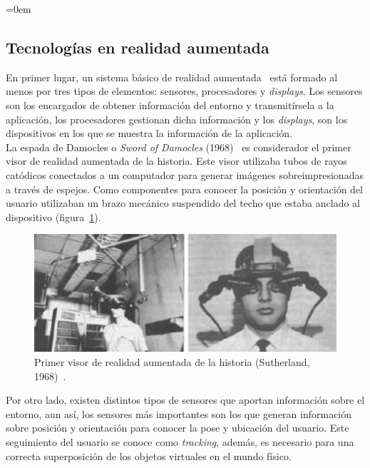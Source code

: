 \parindent=0em
\subsection{Tecnologías en realidad aumentada}
\label{techAR}
\noindent


En primer lugar, un sistema básico de realidad aumentada~\cite{arhardwarerequirements} está formado al menos por tres tipos de elementos: sensores, procesadores y \textit{displays}. Los sensores son los encargados de obtener información del entorno y transmitírsela a la aplicación, los procesadores gestionan dicha información y los \textit{displays}, son los dispositivos en los que se muestra la información de la aplicación.\\

La espada de Damocles o \textit{Sword of Damocles} (1968)~\cite{swordOfDamocles} es considerador el primer visor de realidad aumentada de la historia. Este visor utilizaba tubos de rayos catódicos conectados a un computador para generar imágenes sobreimpresionadas a través de espejos. Como componentes para conocer la posición y orientación del usuario utilizaban un brazo mecánico suspendido del techo que estaba anclado al dispositivo (figura~\ref{fig:swordOfDamocles}). 

\begin{figure}[H]
    \centering
    \includegraphics[scale=0.4]{Images/Estado del arte/The-worlds-first-head-mounted-display-with-the-Sword-of-Damocles-Sutherland-1968.png}
    \caption{Primer visor de realidad aumentada de la historia (Sutherland, 1968)~\cite{swordOfDamocles}.}
    \label{fig:swordOfDamocles}
\end{figure}

Por otro lado, existen distintos tipos de sensores que aportan información sobre el entorno, aun así, los sensores más importantes son los que generan información sobre posición y orientación para conocer la pose y ubicación del usuario. Este seguimiento del usuario se conoce como \textit{tracking}, además, es necesario para una correcta superposición de los objetos virtuales en el mundo físico.\\

